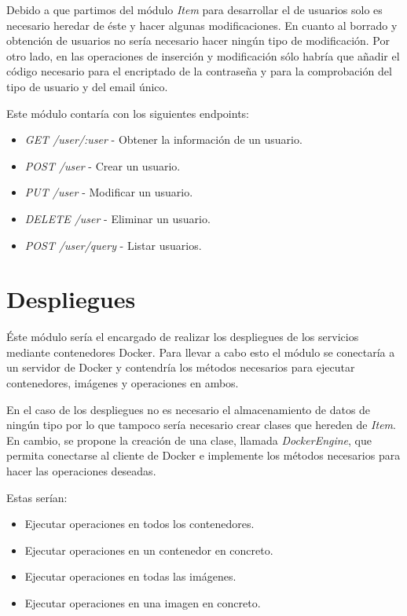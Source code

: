 \bigskip
Debido a que partimos del módulo \textit{Item} para desarrollar el de usuarios solo es necesario heredar de éste y hacer algunas modificaciones. En cuanto al borrado y obtención de usuarios no sería necesario hacer ningún tipo de modificación. Por otro lado, en las operaciones de inserción y modificación sólo habría que añadir el código necesario para el encriptado de la contraseña y para la comprobación del tipo de usuario y del email único.

\bigskip
Este módulo contaría con los siguientes endpoints:
\begin{itemize}
	\item \textit{GET /user/:user} - Obtener la información de un usuario.
	\item \textit{POST /user} - Crear un usuario.
	\item \textit{PUT /user} - Modificar un usuario.
	\item \textit{DELETE /user} - Eliminar un usuario.
	\item \textit{POST /user/query} - Listar usuarios.
\end{itemize} 





\section{Despliegues}

Éste módulo sería el encargado de realizar los despliegues de los servicios mediante contenedores Docker. Para llevar a cabo esto el módulo se conectaría a un servidor de Docker y contendría los métodos necesarios para ejecutar contenedores, imágenes y operaciones en ambos.

\bigskip
En el caso de los despliegues no es necesario el almacenamiento de datos de ningún tipo por lo que tampoco sería necesario crear clases que hereden de \textit{Item}. En cambio, se propone la creación de una clase, llamada \textit{DockerEngine}, que permita conectarse al cliente de Docker e implemente los métodos necesarios para hacer las operaciones deseadas.

\bigskip
Estas serían:
\begin{itemize}
	\item Ejecutar operaciones en todos los contenedores.
	\item Ejecutar operaciones en un contenedor en concreto.
	\item Ejecutar operaciones en todas las imágenes.
	\item Ejecutar operaciones en una imagen en concreto.
\end{itemize}


